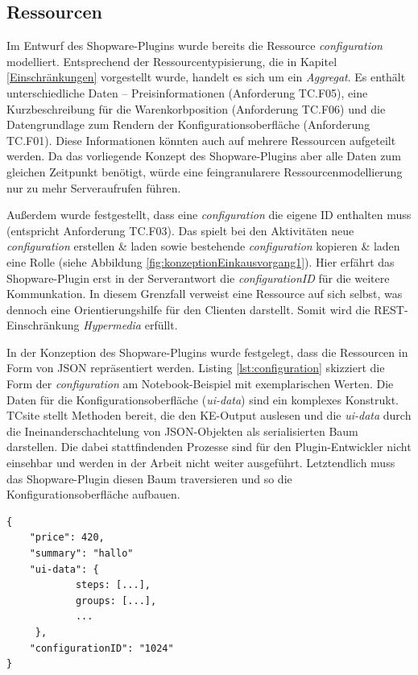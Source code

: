 \documentclass[11pt, a4paper, titlepage, listof=totoc, bibliography=totoc, index=totoc, twoside, openright, headings=normal]{scrreprt}
\begin{document}
\subsection{Ressourcen}
Im Entwurf des Shopware-Plugins wurde bereits die Ressource \emph{configuration} modelliert. Entsprechend der Ressourcentypisierung, die in Kapitel \ref{Einschränkungen} vorgestellt wurde, handelt es sich um ein \emph{Aggregat}. Es enthält unterschiedliche Daten -- Preisinformationen (Anforderung TC.F05), eine Kurzbeschreibung für die Warenkorbposition (Anforderung TC.F06) und die Datengrundlage zum Rendern der Konfigurationsoberfläche (Anforderung TC.F01). Diese Informationen könnten auch auf mehrere Ressourcen aufgeteilt werden. Da das vorliegende Konzept des Shopware-Plugins aber alle Daten zum gleichen Zeitpunkt benötigt, würde eine feingranularere Ressourcenmodellierung nur zu mehr Serveraufrufen führen.

Außerdem wurde festgestellt, dass eine \emph{configuration} die eigene ID enthalten muss (entspricht Anforderung TC.F03). Das spielt bei den Aktivitäten \glqq neue \emph{configuration} erstellen \& laden\grqq{}  sowie \glqq bestehende \emph{configuration} kopieren \& laden\grqq{} eine Rolle (siehe Abbildung \ref{fig:konzeptionEinkausvorgang1}). Hier erfährt das Shopware-Plugin erst in der Serverantwort die \emph{configurationID} für die weitere Kommunkation. In diesem Grenzfall verweist eine Ressource auf sich selbst, was dennoch eine Orientierungshilfe für den Clienten darstellt. Somit wird die REST-Einschränkung \emph{Hypermedia} erfüllt.

In der Konzeption des Shopware-Plugins wurde festgelegt, dass die Ressourcen in Form von JSON repräsentiert werden. Listing \ref{lst:configuration} skizziert die Form der \emph{configuration} am Notebook-Beispiel mit exemplarischen Werten. Die Daten für die Konfigurationsoberfläche (\emph{ui-data}) sind ein komplexes Konstrukt. TCsite stellt Methoden bereit, die den KE-Output auslesen und die \emph{ui-data} durch die Ineinanderschachtelung von JSON-Objekten als serialisierten Baum darstellen. Die dabei stattfindenden Prozesse sind für den Plugin-Entwickler nicht einsehbar und werden in der Arbeit nicht weiter ausgeführt. Letztendlich muss das Shopware-Plugin diesen Baum traversieren und so die Konfigurationsoberfläche aufbauen.

\vspace{1em}
\begin{lstlisting}[caption=Beispiel einer \emph{configuration}, label=lst:configuration]
{
	"price": 420,
	"summary": "hallo"
	"ui-data": {
			steps: [...],
			groups: [...],
			...
	 },
	"configurationID": "1024"
}
\end{lstlisting}
\end{document}
